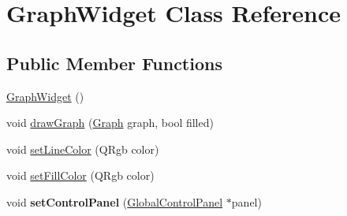 \hypertarget{classGraphWidget}{}\section{Graph\+Widget Class Reference}
\label{classGraphWidget}
\subsection*{Public Member Functions}
\begin{DoxyCompactItemize}
\item 
\hyperlink{classGraphWidget_a6d80d51caf0aee4c148baee49978f8c3}{Graph\+Widget} ()
\item 
void \hyperlink{classGraphWidget_a8a130588901353f0ca39f876042ece33}{draw\+Graph} (\hyperlink{classGraph}{Graph} graph, bool filled)
\item 
void \hyperlink{classGraphWidget_ac7a4a8dd961c4b9c732ef22bfb4143ce}{set\+Line\+Color} (Q\+Rgb color)
\item 
void \hyperlink{classGraphWidget_a7d8af579d2c285a372ec5bc60cbac4c1}{set\+Fill\+Color} (Q\+Rgb color)
\item 
\hypertarget{classGraphWidget_a85370d70df64a0c5e372ebd5a317a2d7}{}void {\bfseries set\+Control\+Panel} (\hyperlink{classGlobalControlPanel}{Global\+Control\+Panel} $\ast$panel)\label{classGraphWidget_a85370d70df64a0c5e372ebd5a317a2d7}

\end{DoxyCompactItemize}
